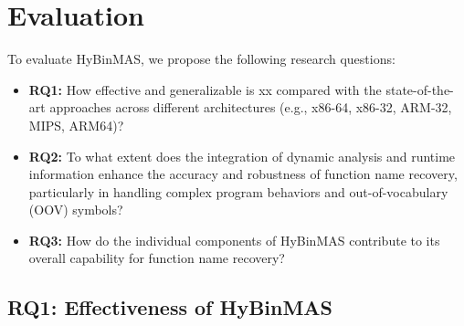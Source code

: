 \documentclass[acmsmall,screen,review,anonymous]{acmart} %
\begin{document}
\section{Evaluation}
To evaluate HyBinMAS, we propose the following research questions:
\begin{itemize}
    \item \textbf{RQ1:} How effective and generalizable is xx compared with the state-of-the-art approaches across different architectures (e.g., x86-64, x86-32, ARM-32, MIPS, ARM64)?
    \item \textbf{RQ2:} To what extent does the integration of dynamic analysis and runtime information enhance the accuracy and robustness of function name recovery, particularly in handling complex program behaviors and out-of-vocabulary (OOV) symbols?
    \item \textbf{RQ3:} How do the individual components of HyBinMAS contribute to its overall capability for function name recovery? %
\end{itemize}


\subsection{RQ1: Effectiveness of HyBinMAS}
\end{document}
